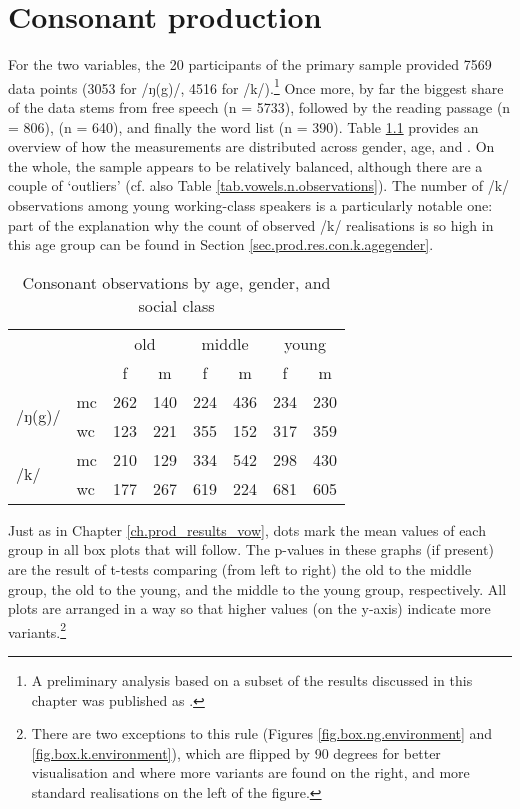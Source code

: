 \chapter{Consonant production}
\label{prod.res.con}

For the two  variables, the 20 participants of the primary sample provided 7569 data points (3053 for /ŋ(g)/, 4516 for /k/).\footnote{A preliminary analysis based on a subset of the results discussed in this chapter was published as \citealt{juskanaccentrevivallipp}.}
Once more, by far the biggest share of the data stems from free speech (n = 5733), followed by the reading passage (n = 806),  (n = 640), and finally the word list (n = 390).
Table \ref{tab.consonants.n.observations} provides an overview of how the measurements are distributed across gender, age, and .
On the whole, the sample appears to be relatively balanced, although there are a couple of `outliers' (cf. also Table \ref{tab.vowels.n.observations}).
The number of /k/ observations among young working-class speakers is a particularly notable one: part of the explanation why the count of observed /k/ realisations is so high in this age group can be found in Section \ref{sec.prod.res.con.k.agegender}.

\begin{table}[h!]
	\centering
	\caption{Consonant observations by age, gender, and social class}
	\label{tab.consonants.n.observations}
	\begin{tabular}{llcccccc}
		\hline
		\multicolumn{2}{c}{} & \multicolumn{2}{c}{old} & \multicolumn{2}{c}{middle} & \multicolumn{2}{c}{young}\\
		& & f & m & f & m & f & m\\
		\hline
		\multirow{2}{*}{/ŋ(g)/} & mc & 262 & 140 & 224 & 436 & 234 & 230\\
		& wc & 123 & 221 & 355 & 152 & 317 & 359\\
		\multirow{2}{*}{/k/} & mc & 210 & 129 & 334 & 542 & 298 & 430\\
		& wc & 177 & 267 & 619 & 224 & 681 & 605\\
		\hline
	\end{tabular}
\end{table}

Just as in Chapter \ref{ch.prod_results_vow}, dots mark the mean values of each group in all box plots that will follow.
The p-values in these graphs (if present) are the result of t-tests comparing (from left to right) the old to the middle group, the old to the young, and the middle to the young group, respectively.
All plots are arranged in a way so that higher values (on the y-axis) indicate more  variants.\footnote{There are two exceptions to this rule (Figures \ref{fig.box.ng.environment} and \ref{fig.box.k.environment}), which are flipped by 90 degrees for better visualisation and where more  variants are found on the right, and more standard realisations on the left of the figure.}


